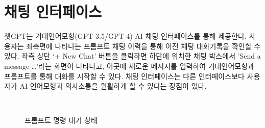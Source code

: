\documentclass[
  letterpaper,
]{book}
\begin{document}
\hypertarget{uxcc44uxd305-uxc778uxd130uxd398uxc774uxc2a4}{%
\section{채팅
인터페이스}\label{uxcc44uxd305-uxc778uxd130uxd398uxc774uxc2a4}}

챗GPT는 거대언어모형(GPT-3.5/GPT-4) AI 채팅 인터페이스를 통해 제공한다.
사용자는 좌측편에 나타나는 프롬프트 채팅 이력을 통해 이전 채팅
대화기록을 확인할 수 있다. 좌측 상단 `+ New Chat' 버튼을 클릭하면 하단에
위치한 채팅 박스에서 'Send a message \ldots'라는 화면이 나타나고, 이곳에
새로운 메시지를 입력하여 거대언어모형과 프롬프트를 통해 대화를 시작할 수
있다. 채팅 인터페이스는 다른 인터페이스보다 사용자가 AI 언어모형과
의사소통을 원활하게 할 수 있다는 장점이 있다.

\begin{figure}

\begin{minipage}[t]{0.47\linewidth}

{\centering 


\caption{프롬프트 명령 대기 상태}

}

\end{minipage}%
%
\begin{minipage}[t]{0.05\linewidth}

{\centering 

~

}


\end{minipage}
\end{figure}
\end{document}

